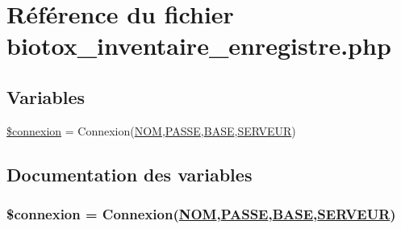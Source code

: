 \hypertarget{biotox__inventaire__enregistre_8php}{
\section{R\'{e}f\'{e}rence du fichier biotox\_\-inventaire\_\-enregistre.php}
\label{biotox__inventaire__enregistre_8php}
}
\subsection*{Variables}
\begin{CompactItemize}
\item 
\hyperlink{biotox__inventaire__enregistre_8php_a0}{\$connexion} = Connexion(\hyperlink{pma__connect_8php_a0}{NOM},\hyperlink{pma__connect_8php_a1}{PASSE},\hyperlink{pma__connect_8php_a3}{BASE},\hyperlink{pma__connect_8php_a2}{SERVEUR})
\end{CompactItemize}


\subsection{Documentation des variables}
\hypertarget{biotox__inventaire__enregistre_8php_a0}{
\subsubsection[\$connexion]{\setlength{\rightskip}{0pt plus 5cm}\$connexion = Connexion(\hyperlink{pma__connect_8php_a0}{NOM},\hyperlink{pma__connect_8php_a1}{PASSE},\hyperlink{pma__connect_8php_a3}{BASE},\hyperlink{pma__connect_8php_a2}{SERVEUR})}}
\label{biotox__inventaire__enregistre_8php_a0}


